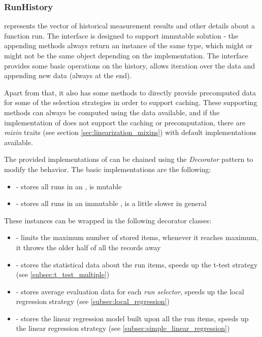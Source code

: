 \subsubsection{RunHistory}
\label{subsubsec:run_history}

 represents the vector of historical measurement results and other details about a function run. The interface is designed to support immutable solution - the appending methods always return an instance of the same type, which might or might not be the same object depending on the implementation. The interface provides some basic operations on the history, allows iteration over the data and appending new data (always at the end). 

Apart from that, it also has some methods to directly provide precomputed data for some of the selection strategies in order to support caching. These supporting methods can always be computed using the data available, and if the implementation of  does not support the caching or precomputation, there are \textit{mixin} traits (see section \ref{sec:linearization_mixins}) with default implementations available.

The provided implementations of  can be chained using the \textit{Decorator} pattern to modify the behavior. The basic implementations are the following:
\begin{itemize}
	\item {} - stores all runs in an , is mutable
	\item {} - stores all runs in an immutable , is a little slower in general
\end{itemize}

These instances can be wrapped in the following decorator classes:
\begin{itemize}
	\item {} - limits the maximum number of stored items, whenever it reaches maximum, it throws the older half of all the records away
	\item {} - stores the statistical data about the run items, speeds up the t-test strategy (see \ref{subsec:t_test_multiple})
	\item {} - stores average evaluation data for each \textit{run selector}, speeds up the local regression strategy (see \ref{subsec:local_regression})
	\item {} - stores the linear regression model built upon all the run items, speeds up the linear regression strategy (see \ref{subsec:simple_linear_regression})
\end{itemize}

